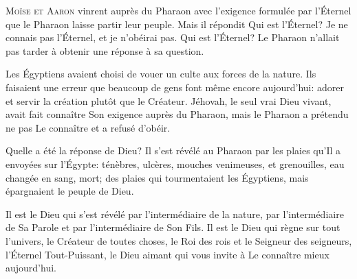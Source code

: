 



\lettrine{M}{oïse et Aaron} vinrent auprès du Pharaon
 avec l'exigence formulée par l'Éternel que le Pharaon
 laisse partir leur peuple.
 Mais il répondit\frcolon{} \Og Qui est l'Éternel? Je ne connais pas l'Éternel,
 et je n'obéirai pas. \Fg{}
 Qui est l'Éternel? Le Pharaon n'allait pas tarder
 à obtenir une réponse à sa question.

Les Égyptiens avaient choisi de vouer un culte aux forces de la nature.
 Ils faisaient une erreur que beaucoup de gens font même encore aujourd'hui:
 adorer et servir la création plutôt que le Créateur.
 Jéhovah, le seul vrai Dieu vivant, avait fait connaître Son exigence
 auprès du Pharaon, mais le Pharaon a prétendu
 ne pas Le connaître et a refusé d'obéir.

Quelle a été la réponse de Dieu? Il s'est révélé au Pharaon
 par les plaies qu'Il a envoyées sur l'Égypte:
 ténèbres, ulcères, mouches venimeuses, et grenouilles,
 eau changée en sang, mort; des plaies qui tourmentaient les Égyptiens,
 mais épargnaient le peuple de Dieu.


Il est le Dieu qui s'est révélé par l'intermédiaire de la nature,
 par l'intermédiaire de Sa Parole et par l'intermédiaire de Son Fils.
 Il est le Dieu qui règne sur tout l'univers, le Créateur de toutes choses,
 le Roi des rois et le Seigneur des seigneurs,
 l'Éternel Tout-Puissant, le Dieu aimant
 qui vous invite à Le connaître mieux aujourd'hui. 

\dvrule



